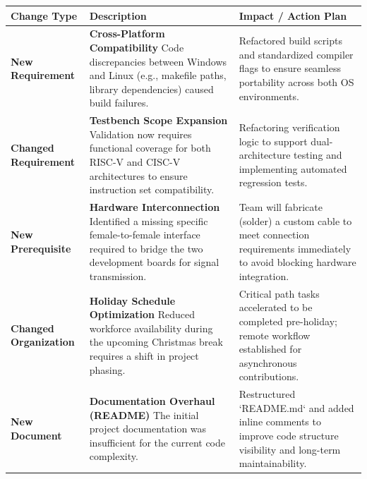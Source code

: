 \documentclass[10pt]{article}
\begin{document}
\begin{table}[h!]
    \centering
    \renewcommand{\arraystretch}{1.6} %
    \begin{tabular}{|p{}|p{}|p{}|}
        \hline
        \textbf{Change Type} & \textbf{Description} & \textbf{Impact / Action Plan} \\
        \hline
        
        \textbf{New Requirement} & 
        \textbf{Cross-Platform Compatibility} \newline 
        Code discrepancies between Windows and Linux (e.g., makefile paths, library dependencies) caused build failures. & 
        Refactored build scripts and standardized compiler flags to ensure seamless portability across both OS environments. \\
        \hline
        
        \textbf{Changed Requirement} & 
        \textbf{Testbench Scope Expansion} \newline 
        Validation now requires functional coverage for both RISC-V and CISC-V architectures to ensure instruction set compatibility. & 
        Refactoring verification logic to support dual-architecture testing and implementing automated regression tests. \\
        \hline
        
        \textbf{New Prerequisite} & 
        \textbf{Hardware Interconnection} \newline 
        Identified a missing specific female-to-female interface required to bridge the two development boards for signal transmission. & 
        Team will fabricate (solder) a custom cable to meet connection requirements immediately to avoid blocking hardware integration. \\
        \hline
        
        \textbf{Changed Organization} & 
        \textbf{Holiday Schedule Optimization} \newline 
        Reduced workforce availability during the upcoming Christmas break requires a shift in project phasing. & 
        Critical path tasks accelerated to be completed pre-holiday; remote workflow established for asynchronous contributions. \\
        \hline
        
        \textbf{New Document} & 
        \textbf{Documentation Overhaul (README)} \newline 
        The initial project documentation was insufficient for the current code complexity. & 
        Restructured `README.md` and added inline comments to improve code structure visibility and long-term maintainability. \\
        \hline
        

\end{tabular}
\end{table}
\end{document}

